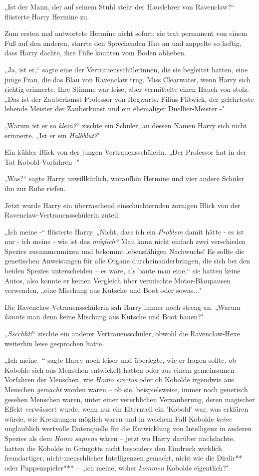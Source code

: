 {„Ist der Mann, der auf seinem Stuhl steht der Hauslehrer von Ravenclaw?“ flüsterte Harry Hermine zu.

Zum ersten mal antwortete Hermine nicht sofort; sie trat permanent von einem Fuß auf den anderen, starrte den Sprechenden Hut an und zappelte so heftig, dass Harry dachte, ihre Füße könnten vom Boden abheben.

„Ja, ist er,“ sagte eine der Vertrauensschülerinnen, die sie begleitet hatten, eine junge Frau, die das Blau von Ravenclaw trug. Miss Clearwater, wenn Harry sich richtig erinnerte. Ihre Stimme war leise, aber vermittelte einen Hauch von stolz. „Das ist der Zauberkunst-Professor von Hogwarts, Filius Flitwick, der gelehrteste lebende Meister der Zauberkunst und ein ehemaliger Duellier-Meister -"

„Warum ist er so \emph{klein?}“ zischte ein Schüler, an dessen Namen Harry sich nicht erinnerte. „Ist er ein \emph{Halbblut?}"

Ein kühler Blick von der jungen Vertrauensschülerin. „Der Professor hat in der Tat Kobold-Vorfahren -"

„Was?“ sagte Harry unwillkürlich, woraufhin Hermine und vier andere Schüler ihn zur Ruhe riefen.

Jetzt wurde Harry ein überraschend einschüchternden zornigen Blick von der Ravenclaw-Vertrauensschülerin zuteil.

„Ich meine -“ flüsterte Harry. „Nicht, dass ich ein \emph{Problem} damit hätte - es ist nur - ich meine - wie ist das \emph{möglich?} Man kann nicht einfach zwei verschieden Spezies zusammenmixen und bekommt lebensfähigen Nachwuchs! Es sollte die genetischen Anweisungen für alle Organe durcheinanderbringen, die sich bei den beiden Spezies unterscheiden -- es wäre, als baute man eine,“ sie hatten keine Autos, also konnte er keinen Vergleich über vermischte Motor-Blaupausen verwenden, „eine Mischung aus Kutsche und Boot oder sowas..."

Die Ravenclaw-Vetrauensschülerin sah Harry immer noch streng an. „Warum \emph{könnte} man denn keine Mischung aus Kutsche und Boot bauen?"

„\emph{Sscchht!}“ zischte ein anderer Vertrauensschüler, obwohl die Ravenclaw-Hexe weiterhin leise gesprochen hatte.

„Ich meine -“ sagte Harry noch leiser und überlegte, wie er fragen sollte, ob Kobolde sich aus Menschen entwickelt hatten oder aus einem gemeinsamen Vorfahren der Menschen, wie \emph{Homo erectus} oder ob Kobolde irgendwie aus Menschen \emph{gemacht} worden waren -- ob sie, beispielsweise, immer noch genetisch gesehen Menschen waren, unter einer vererblichen Verzauberung, deren magischer Effekt verwässert wurde, wenn nur ein Elternteil ein 'Kobold' war, was erklären würde, wie Kreuzungen möglich waren und in welchem Fall Kobolde \emph{keine} unglaublich wertvolle Datenquelle für die Entwicklung von Intelligenz in anderen Spezies als dem \emph{Homo sapiens} wären -- jetzt wo Harry darüber nachdachte, hatten die Kobolde in Gringotts nicht besonders den Eindruck wirklich fremdartiger, nicht-menschlicher Intelligenzen gemacht, nicht wie die Dirdir** oder Puppenspieler*** -- „ich meine, woher \emph{kommen} Kobolde eigentlich?"

}
